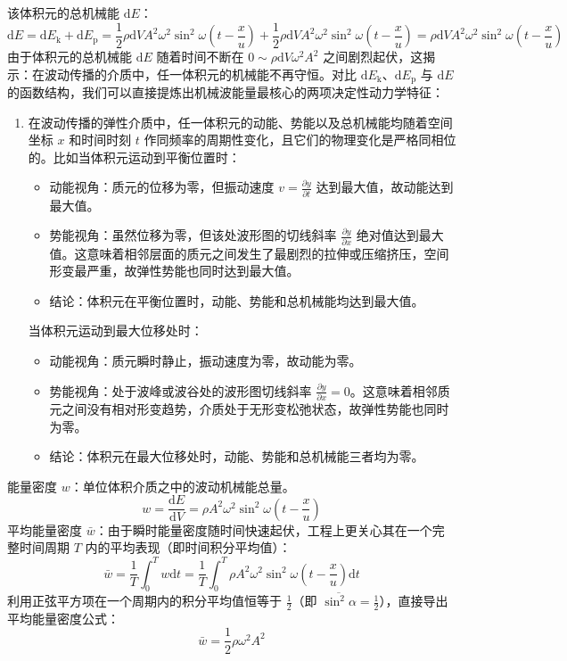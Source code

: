 该体积元的总机械能 $\mathrm{d}E$：
$$\mathrm{d}E = \mathrm{d}E_{\text{k}} + \mathrm{d}E_{\text{p}} = \frac{1}{2} \rho \mathrm{d}V A^2 \omega^2 \sin^2 \omega \left( t - \frac{x}{u} \right) + \frac{1}{2} \rho \mathrm{d}V A^2 \omega^2 \sin^2 \omega \left( t - \frac{x}{u} \right)= \rho \mathrm{d}V A^2 \omega^2 \sin^2 \omega \left( t - \frac{x}{u} \right)$$
由于体积元的总机械能 $\mathrm{d}E$ 随着时间不断在 $0 \sim \rho \mathrm{d}V \omega^2 A^2$ 之间剧烈起伏，这揭示：在波动传播的介质中，任一体积元的机械能不再守恒。对比 $\mathrm{d}E_{\text{k}}$、\textbf{$\mathrm{d}E_{\text{p}}$} 与 $\mathrm{d}E$ 的函数结构，我们可以直接提炼出机械波能量最核心的两项决定性动力学特征：
\begin{enumerate}
\item 在波动传播的弹性介质中，任一体积元的动能、势能以及总机械能均随着空间坐标 $x$ 和时间时刻 $t$ 作同频率的周期性变化，且它们的物理变化是严格同相位的。比如当体积元运动到平衡位置时：
\begin{itemize}
\item 动能视角：质元的位移为零，但振动速度 $v = \frac{\partial y}{\partial t}$ 达到最大值，故动能达到最大值。
\item 势能视角：虽然位移为零，但该处波形图的切线斜率 $\frac{\partial y}{\partial x}$ 绝对值达到最大值。这意味着相邻层面的质元之间发生了最剧烈的拉伸或压缩挤压，空间形变最严重，故弹性势能也同时达到最大值。
\item 结论：体积元在平衡位置时，动能、势能和总机械能均达到最大值。
\end{itemize}
当体积元运动到最大位移处时：
\begin{itemize}
\item 动能视角：质元瞬时静止，振动速度为零，故动能为零。
\item 势能视角：处于波峰或波谷处的波形图切线斜率 $\frac{\partial y}{\partial x} = 0$。这意味着相邻质元之间没有相对形变趋势，介质处于无形变松弛状态，故弹性势能也同时为零。
\item 结论：体积元在最大位移处时，动能、势能和总机械能三者均为零。
\end{itemize}
\end{enumerate}

\begin{definition}[能量密度与平均能量密度]
能量密度 $w$：单位体积介质之中的波动机械能总量。$$w = \frac{\mathrm{d}E}{\mathrm{d}V} = \rho A^2 \omega^2 \sin^2 \omega \left( t - \frac{x}{u} \right)$$
平均能量密度 $\bar{w}$：由于瞬时能量密度随时间快速起伏，工程上更关心其在一个完整时间周期 $T$ 内的平均表现（即时间积分平均值）：$$\bar{w} = \frac{1}{T} \int_{0}^{T} w \mathrm{d}t = \frac{1}{T} \int_{0}^{T} \rho A^2 \omega^2 \sin^2 \omega \left( t - \frac{x}{u} \right) \mathrm{d}t$$利用正弦平方项在一个周期内的积分平均值恒等于 $\frac{1}{2}$（即 $\overline{\sin^2\alpha} = \frac{1}{2}$），直接导出平均能量密度公式：$$\boxed{\bar{w} = \frac{1}{2} \rho \omega^2 A^2}$$
\end{definition}

